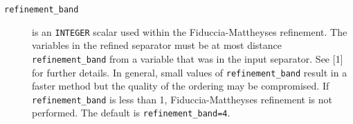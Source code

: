 \begin{description}

\item[\texttt{refinement\_band}] is an {\tt INTEGER} scalar used within the 
Fiduccia-Mattheyses refinement. The variables in the refined separator must be 
at most distance {\tt refinement\_band} from a variable that was in the input 
separator. See [1] for further details. In general, small 
values of {\tt refinement\_band} result in a faster method but the quality of 
the ordering may be compromised. If {\tt refinement\_band} is less than 1, 
Fiduccia-Mattheyses refinement is not performed. The default is 
{\tt refinement\_band=4}.


\end{description}
